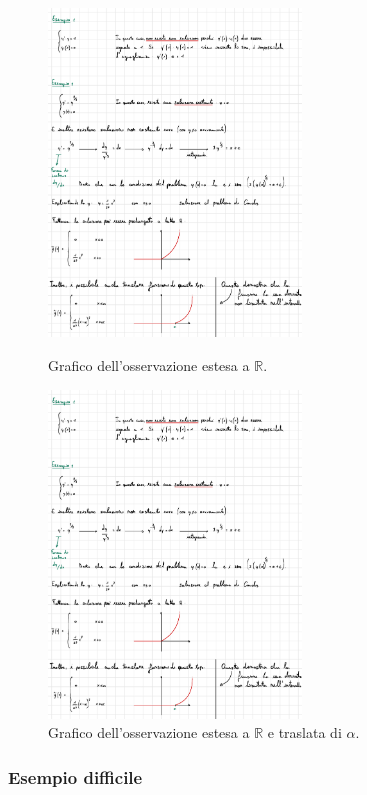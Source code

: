 \documentclass[a4paper]{article}
\begin{document}
	\begin{figure}[!htp]
		\centering
		\includegraphics[width=0.6\textwidth]{img/prob_cauchy-variabili_separabili-OSS.pdf}
		\caption{Grafico dell'osservazione estesa a $\mathbb{R}$.}
		\includegraphics[width=0.6\textwidth]{img/prob_cauchy-variabili_separabili-OSS2.pdf}
		\caption{Grafico dell'osservazione estesa a $\mathbb{R}$ e traslata di $\alpha$.}
	\end{figure}

	\newpage
	
	\subsubsection[Esempio difficile]{\textcolor{Green4}{\textbf{Esempio difficile}}}
	
\end{document}
